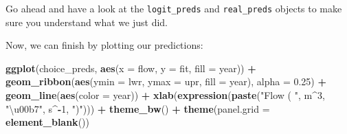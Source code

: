 \documentclass[
]{book}
\newenvironment{Shaded}{\begin{snugshade}}{\end{snugshade}}
\newcommand{\CommentTok}[1]{\textcolor[rgb]{0.56,0.35,0.01}{\textit{#1}}}
\newcommand{\DataTypeTok}[1]{\textcolor[rgb]{0.13,0.29,0.53}{#1}}
\newcommand{\DecValTok}[1]{\textcolor[rgb]{0.00,0.00,0.81}{#1}}
\newcommand{\FloatTok}[1]{\textcolor[rgb]{0.00,0.00,0.81}{#1}}
\newcommand{\KeywordTok}[1]{\textcolor[rgb]{0.13,0.29,0.53}{\textbf{#1}}}
\newcommand{\NormalTok}[1]{#1}
\newcommand{\OperatorTok}[1]{\textcolor[rgb]{0.81,0.36,0.00}{\textbf{#1}}}
\newcommand{\OtherTok}[1]{\textcolor[rgb]{0.56,0.35,0.01}{#1}}
\newcommand{\StringTok}[1]{\textcolor[rgb]{0.31,0.60,0.02}{#1}}
\begin{document}
\begin{Shaded}
\end{Shaded}

Go ahead and have a look at the \texttt{logit\_preds} and \texttt{real\_preds} objects to make sure you understand what we just did.

Now, we can finish by plotting our predictions:

\begin{Shaded}
\begin{Highlighting}[]
\KeywordTok{ggplot}\NormalTok{(choice_preds, }\KeywordTok{aes}\NormalTok{(}\DataTypeTok{x =}\NormalTok{ flow, }\DataTypeTok{y =}\NormalTok{ fit, }\DataTypeTok{fill =}\NormalTok{ year)) }\OperatorTok{+}
\StringTok{  }\KeywordTok{geom_ribbon}\NormalTok{(}\KeywordTok{aes}\NormalTok{(}\DataTypeTok{ymin =}\NormalTok{ lwr, }\DataTypeTok{ymax =}\NormalTok{ upr, }\DataTypeTok{fill =}\NormalTok{ year), }\DataTypeTok{alpha =} \FloatTok{0.25}\NormalTok{) }\OperatorTok{+}
\StringTok{  }\KeywordTok{geom_line}\NormalTok{(}\KeywordTok{aes}\NormalTok{(}\DataTypeTok{color =}\NormalTok{ year)) }\OperatorTok{+}
\StringTok{  }\KeywordTok{xlab}\NormalTok{(}\KeywordTok{expression}\NormalTok{(}\KeywordTok{paste}\NormalTok{(}\StringTok{"Flow ( "}\NormalTok{, m}\OperatorTok{^}\DecValTok{3}\NormalTok{, }\StringTok{"\textbackslash{}u00b7"}\NormalTok{, s}\OperatorTok{^-}\DecValTok{1}\NormalTok{, }\StringTok{")"}\NormalTok{))) }\OperatorTok{+}
\StringTok{  }\KeywordTok{theme_bw}\NormalTok{() }\OperatorTok{+}
\StringTok{  }\KeywordTok{theme}\NormalTok{(}\DataTypeTok{panel.grid =} \KeywordTok{element_blank}\NormalTok{())}
\end{Highlighting}
\end{Shaded}
\end{document}
